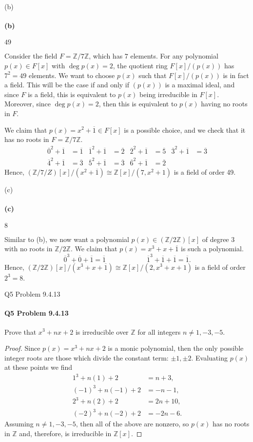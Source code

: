 \documentclass[12pt]{article}
\newenvironment{fullbox}{\begin{lrbox}{\savefullbox}\begin{minipage}{\dimexpr\textwidth-2\fboxsep\relax}}{\end{minipage}\end{lrbox}\begin{center}\framebox[\textwidth]{\usebox{\savefullbox}}\end{center}}
\newenvironment{pbox}[1][]{\begin{fullbox}\ifx#1\empty\else\paragraph{#1}\fi}{\end{fullbox}}
\theoremstyle{definition}
\newcommand{\Z}{\mathbb{Z}}
\newcommand{\isom}{\cong}
\newcommand{\eqc}{\overline}
\begin{document}
\begin{pbox}[(b)]
    $49$
\end{pbox}

Consider the field $F = \Z/7\Z$, which has $7$ elements. For any polynomial $p(x) \in F[x]$ with $\deg p(x) = 2$, the quotient ring $F[x]/(p(x))$ has $7^2 = 49$ elements. We want to choose $p(x)$ such that $F[x]/(p(x))$ is in fact a field. This will be the case if and only if $(p(x))$ is a maximal ideal, and since $F$ is a field, this is equivalent to $p(x)$ being irreducible in $F[x]$. Moreover, since $\deg p(x) = 2$, then this is equivalent to $p(x)$ having no roots in $F$.

We claim that $p(x) = x^2 + \eqc{1} \in F[x]$ is a possible choice, and we check that it has no roots in $F = \Z/7\Z$.
\begin{align*}
    \eqc{0}^2 + \eqc{1} &= \eqc{1} &
    \eqc{1}^2 + \eqc{1} &= \eqc{2} &
    \eqc{2}^2 + \eqc{1} &= \eqc{5} &
    \eqc{3}^2 + \eqc{1} &= \eqc{3} \\
    \eqc{4}^2 + \eqc{1} &= \eqc{3} &
    \eqc{5}^2 + \eqc{1} &= \eqc{3} &
    \eqc{6}^2 + \eqc{1} &= \eqc{2} &
\end{align*}
Hence, $(\Z/7/Z)[x]/(x^2 + \eqc{1}) \isom \Z[x]/(7, x^2 + 1)$ is a field of order 49.

\begin{pbox}[(c)]
    $8$
\end{pbox}

Similar to (b), we now want a polynomial $p(x) \in (\Z/2\Z)[x]$ of degree $3$ with no roots in $\Z/2\Z$. We claim that $p(x) = x^3 + x + \eqc{1}$ is such a polynomial.
\[
    \eqc{0}^3 + \eqc{0} + \eqc{1} = \eqc{1} \hspace{1in} \eqc{1}^3 + \eqc{1} + \eqc{1} = \eqc{1}.
\]
Hence, $(\Z/2\Z)[x]/(x^3 + x + \eqc{1}) \isom \Z[x]/(2, x^3 + x + 1)$ is a field of order $2^3 = 8$.


\newpage
\begin{pbox}[Q5 Problem 9.4.13]
    Prove that $x^3 + nx + 2$ is irreducible over $\Z$ for all integers $n \ne 1, -3, -5$.
\end{pbox}

\begin{proof}
    Since $p(x) = x^3 + nx + 2$ is a monic polynomial, then the only possible integer roots are those which divide the constant term: $\pm1, \pm2$. Evaluating $p(x)$ at these points we find
    \begin{align*}
        1^3 + n(1) + 2 &= n + 3, \\
        (-1)^3 + n(-1) + 2 &= - n - 1, \\
        2^3 + n(2) + 2 &= 2n + 10, \\
        (-2)^3 + n(-2) + 2 &= -2n - 6.
    \end{align*}
    Assuming $n \ne 1, -3, -5$, then all of the above are nonzero, so $p(x)$ has no roots in $\Z$ and, therefore, is irreducible in $\Z[x]$.
    
\end{proof}
\end{document}
